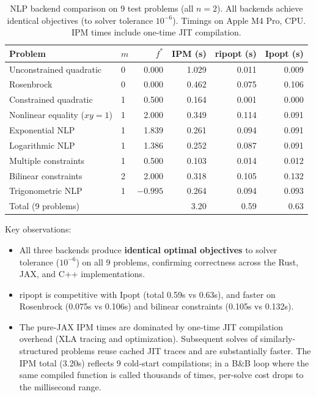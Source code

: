 \documentclass[12pt,preprint]{article}
\begin{document}
\begin{table}[htbp]
\centering
\begin{tabular}{llrrrr}
\toprule
Problem & $m$ & $f^*$ & IPM (s) & ripopt (s) & Ipopt (s) \\
\midrule
Unconstrained quadratic & 0 & 0.000 & 1.029 & 0.011 & 0.009 \\
Rosenbrock & 0 & 0.000 & 0.462 & 0.075 & 0.106 \\
Constrained quadratic & 1 & 0.500 & 0.164 & 0.001 & 0.000 \\
Nonlinear equality ($xy = 1$) & 1 & 2.000 & 0.349 & 0.114 & 0.091 \\
Exponential NLP & 1 & 1.839 & 0.261 & 0.094 & 0.091 \\
Logarithmic NLP & 1 & 1.386 & 0.252 & 0.087 & 0.091 \\
Multiple constraints & 1 & 0.500 & 0.103 & 0.014 & 0.012 \\
Bilinear constraints & 2 & 2.000 & 0.318 & 0.105 & 0.132 \\
Trigonometric NLP & 1 & $-0.995$ & 0.264 & 0.094 & 0.093 \\
\midrule
Total (9 problems) &  &  & 3.20 & 0.59 & 0.63 \\
\bottomrule
\end{tabular}
\caption{NLP backend comparison on 9 test problems (all $n = 2$). All backends achieve identical objectives (to solver tolerance $10^{-6}$). Timings on Apple M4 Pro, CPU. IPM times include one-time JIT compilation.}
\label{tab-nlp-backends}
\end{table}


Key observations:

\begin{itemize}
\item All three backends produce \textbf{identical optimal objectives} to solver tolerance ($10^{-6}$) on all 9 problems, confirming correctness across the Rust, JAX, and C++ implementations.

\item ripopt is competitive with Ipopt (total 0.59s vs 0.63s), and faster on Rosenbrock (0.075s vs 0.106s) and bilinear constraints (0.105s vs 0.132s).

\item The pure-JAX IPM times are dominated by one-time JIT compilation overhead (XLA tracing and optimization). Subsequent solves of similarly-structured problems reuse cached JIT traces and are substantially faster. The IPM total (3.20s) reflects 9 cold-start compilations; in a B\&B loop where the same compiled function is called thousands of times, per-solve cost drops to the millisecond range.
\end{itemize}
\end{document}
